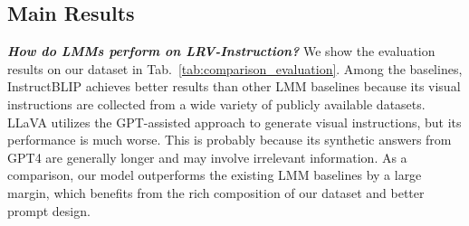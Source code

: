 \subsection{Main Results}
\textbf{\textit{How do LMMs perform on \textit{LRV-Instruction}? }}We show the evaluation results on our dataset in Tab.~\ref{tab:comparison_evaluation}. Among the baselines, InstructBLIP achieves better results than other LMM baselines because its visual instructions are collected from a wide variety of publicly available datasets. LLaVA \cite{liu2023visual} utilizes the GPT-assisted approach to generate visual instructions, but its performance is much worse. This is probably because its synthetic answers from GPT4 are generally longer and may involve irrelevant information. As a comparison, our model outperforms the existing LMM baselines by a large margin, which benefits from the rich composition of our dataset and better prompt design. %


